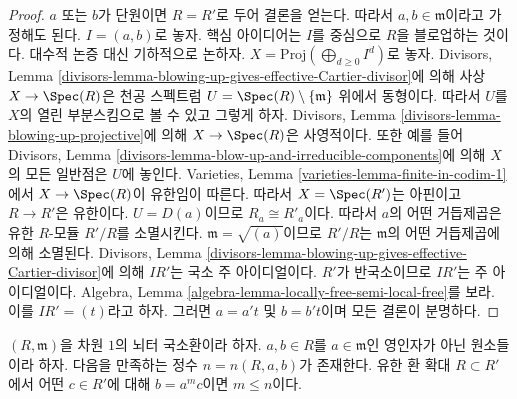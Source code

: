 \begin{proof}
$a$ 또는 $b$가 단원이면 $R = R'$로 두어 결론을 얻는다. 따라서
$a, b \in \mathfrak m$이라고 가정해도 된다. $I = (a, b)$로 놓자.
핵심 아이디어는 $I$를 중심으로 $R$을 블로업하는 것이다. 대수적 논증
대신 기하적으로 논하자. $X = \text{Proj}(\bigoplus_{d \geq 0} I^d)$로
놓자. Divisors, Lemma
\ref{divisors-lemma-blowing-up-gives-effective-Cartier-divisor}에 의해
사상 $X \to \Spec(R)$은 천공 스펙트럼
$U = \Spec(R) \setminus \{\mathfrak m\}$ 위에서 동형이다. 따라서
$U$를 $X$의 열린 부분스킴으로 볼 수 있고 그렇게 하자. Divisors,
Lemma \ref{divisors-lemma-blowing-up-projective}에 의해
$X \to \Spec(R)$은 사영적이다. 또한 예를 들어 Divisors, Lemma
\ref{divisors-lemma-blow-up-and-irreducible-components}에 의해
$X$의 모든 일반점은 $U$에 놓인다. Varieties, Lemma
\ref{varieties-lemma-finite-in-codim-1}에서 $X \to \Spec(R)$이 유한임이
따른다. 따라서 $X = \Spec(R')$는 아핀이고 $R \to R'$은 유한이다.
$U = D(a)$이므로 $R_a \cong R'_a$이다. 따라서 $a$의 어떤 거듭제곱은
유한 $R$-모듈 $R'/R$를 소멸시킨다. $\mathfrak m = \sqrt{(a)}$이므로
$R'/R$는 $\mathfrak m$의 어떤 거듭제곱에 의해 소멸된다. Divisors,
Lemma \ref{divisors-lemma-blowing-up-gives-effective-Cartier-divisor}에 의해
$IR'$는 국소 주 아이디얼이다. $R'$가 반국소이므로 $IR'$는 주
아이디얼이다. Algebra, Lemma
\ref{algebra-lemma-locally-free-semi-local-free}를 보라. 이를
$IR' = (t)$라고 하자. 그러면 $a = a't$ 및 $b = b't$이며 모든 결론이
분명하다.
\end{proof}
\begin{lemma}
\label{lemma-not-infinitely-divisible}
$(R, \mathfrak m)$을 차원 $1$의 뇌터 국소환이라 하자.
$a, b \in R$를 $a \in \mathfrak m$인 영인자가 아닌 원소들이라 하자.
다음을 만족하는 정수 $n = n(R, a, b)$가 존재한다. 유한 환 확대
$R \subset R'$에서 어떤 $c \in R'$에 대해 $b = a^m c$이면
$m \leq n$이다.
\end{lemma}

